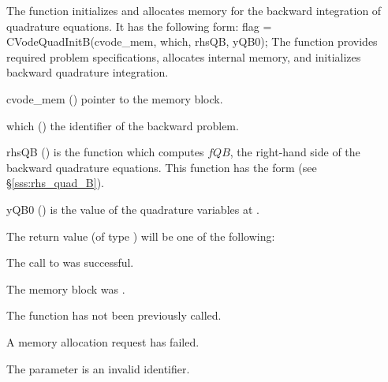 The function  initializes and allocates memory for the backward
integration of quadrature equations. It has the following form:
{
flag = CVodeQuadInitB(cvode\_mem, which, rhsQB, yQB0);
}
{
  The function  provides required problem specifications,
  allocates internal memory, and initializes backward quadrature integration.
}
{
  \begin{args}
  \item[cvode\_mem] ()
    pointer to the {\cvodes} memory block.
  \item[which] ()
    the identifier of the backward problem.
  \item[rhsQB] ()
    is the {\C} function which computes $fQB$, the right-hand side of the 
    backward quadrature equations. This function has the form 
    (see \S\ref{sss:rhs_quad_B}).
  \item[yQB0] ()
    is the value of the quadrature variables at .
  \end{args}
}
{
  The return value  (of type ) will be one of the following:
  \begin{args}
  \item[\Id{CV\_SUCCESS}]
    The call to  was successful.
  \item[\Id{CV\_MEM\_NULL}] 
    The  memory block was .
  \item[\Id{CV\_NO\_ADJ}]
    The function  has not been previously called.
  \item[\Id{CV\_MEM\_FAIL}] 
    A memory allocation request has failed.
  \item[\Id{CV\_ILL\_INPUT}]
    The parameter  is an invalid identifier.
  \end{args}
}
{}



